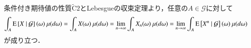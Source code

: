 	\begin{prf}
		条件付き期待値の性質$\tilde{\mathrm{C}}2$とLebesgueの収束定理より，任意の$A \in \mathcal{G}$に対して
		\begin{align}
			\int_A \operatorname{E} \left[ X \ \middle|\ \mathcal{G} \right](\omega)\ \mu(d\omega)
			= \int_A X(\omega)\ \mu(d\omega) = \lim_{n \to \infty} \int_A X_n(\omega)\ \mu(d\omega)
			= \lim_{n \to \infty} \int_A \operatorname{E} \left[ X^n \ \middle|\ \mathcal{G} \right](\omega)\ \mu(d\omega)
		\end{align}
		が成り立つ．
		\QED
	\end{prf}
	